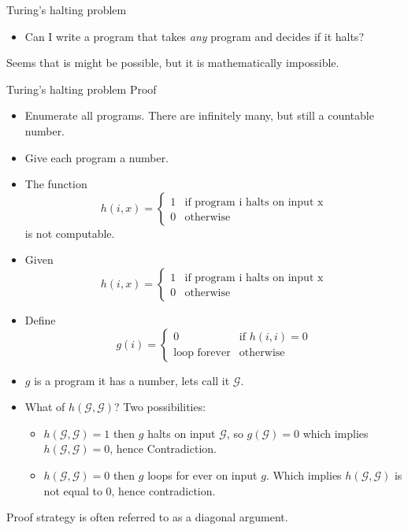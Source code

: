 \documentclass{beamer}
\begin{document}
\begin{frame}{Turing's halting problem}
  \begin{itemize}
  \item Can I write  a program that takes {\em any} program and
    decides if it halts?
  \end{itemize}
Seems that is might be possible, but it is mathematically impossible.
\end{frame}
\begin{frame}{Turing's halting problem}
Proof
  \begin{itemize}
  \item  Enumerate all programs. There are infinitely many, but still
    a countable number.
  \item Give each program a number. 
  \item The function
    \[
      h(i,x) = \begin{cases}
               1 & \text{if program i halts on input x} \\
               0 & \text{otherwise}
               \end{cases}
    \]
is not computable.
  \end{itemize}
\end{frame}
\begin{frame}
  \begin{itemize}
  \item   Given
    \[
      h(i,x) = \begin{cases}
               1 & \text{if program i halts on input x} \\
               0 & \text{otherwise}
               \end{cases}
    \]
  \item Define
    \[
    g(i) = \begin{cases}
             0 & \text{if $h(i,i) = 0$} \\
             \text{loop forever} & \text{otherwise}
           \end{cases}
    \]
\item $g$ is a program it has a number, lets call it $\mathcal{G}$.
\item What of $h(\mathcal{G},\mathcal{G})$? Two possibilities:
  \begin{itemize}
  \item  $h(\mathcal{G},\mathcal{G}) = 1$ then $g$ halts on input $\mathcal{G}$, so $g(\mathcal{G})=0$ which
    implies $h(\mathcal{G},\mathcal{G}) =  0$, hence Contradiction.
  \item $h(\mathcal{G},\mathcal{G}) = 0$ then $g$ loops for ever on input $g$. Which implies
    $h(\mathcal{G},\mathcal{G})$ is not equal to 0, hence contradiction.
  \end{itemize}
  \end{itemize}
Proof strategy is often referred to as a diagonal argument. 
\end{frame}
\end{document}

